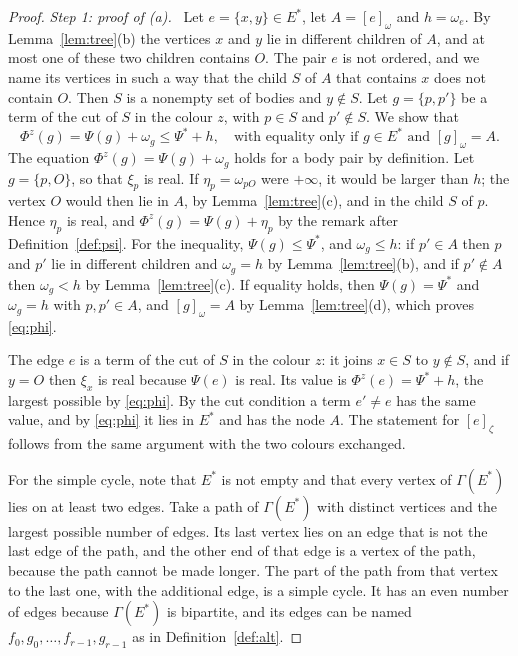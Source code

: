 \documentclass[11pt]{amsart}
\theoremstyle{definition}
\theoremstyle{remark}
\numberwithin{equation}{section}
\newcommand{\Ps}{\Psi^{*}}
\newcommand{\Es}{E^{*}}
\newcommand{\nd}[2]{[#1]_{#2}}
\newcommand{\step}[1]{\smallskip\noindent\textit{#1}\ }
\begin{document}
\begin{proof}
\step{Step 1: proof of (a).} Let $e = \{x, y\} \in \Es$, let $A = \nd{e}{\omega}$ and $h = \omega_e$. By
Lemma~\ref{lem:tree}(b) the vertices $x$ and $y$ lie in different children of $A$, and at most one of
these two children contains $O$. The pair $e$ is not ordered, and we name its vertices in such a way that the child $S$ of $A$ that
contains $x$ does not contain $O$. Then $S$ is a nonempty set of bodies and $y \notin S$. Let $g = \{p, p'\}$ be a term of the cut of $S$ in the colour $z$, with $p \in S$ and
$p' \notin S$. We show that
\begin{equation}\label{eq:phi}
  \Phi^z(g) = \Psi(g) + \omega_g \le \Ps + h, \quad\text{with equality only if } g \in \Es
  \text{ and } \nd{g}{\omega} = A .
\end{equation}
The equation $\Phi^z(g) = \Psi(g) + \omega_g$ holds for a body pair by definition. Let $g = \{p, O\}$,
so that $\xi_p$ is real. If $\eta_p = \omega_{pO}$ were $+\infty$, it would be larger than $h$; the
vertex $O$ would then lie in $A$, by Lemma~\ref{lem:tree}(c), and in the child $S$ of $p$. Hence
$\eta_p$ is real, and $\Phi^z(g) = \Psi(g) + \eta_p$ by the remark after Definition~\ref{def:psi}. For
the inequality, $\Psi(g) \le \Ps$, and $\omega_g \le h$: if $p' \in A$ then $p$ and $p'$ lie in different
children and $\omega_g = h$ by Lemma~\ref{lem:tree}(b), and if $p' \notin A$ then $\omega_g < h$ by
Lemma~\ref{lem:tree}(c). If equality holds, then $\Psi(g) = \Ps$ and $\omega_g = h$ with $p, p' \in A$,
and $\nd{g}{\omega} = A$ by Lemma~\ref{lem:tree}(d), which proves \eqref{eq:phi}.

The edge $e$ is a term of the cut of $S$ in the colour $z$: it joins $x \in S$ to $y \notin S$, and if
$y = O$ then $\xi_x$ is real because $\Psi(e)$ is real. Its value is $\Phi^z(e) = \Ps + h$, the largest
possible by \eqref{eq:phi}. By the cut condition a term $e' \ne e$ has the same value, and by
\eqref{eq:phi} it lies in $\Es$ and has the node $A$. The statement for $\nd{e}{\zeta}$ follows from
the same argument with the two colours exchanged.

For the simple cycle, note that $\Es$ is not empty and that every vertex of $\Gamma(\Es)$ lies on at
least two edges. Take a path of $\Gamma(\Es)$ with distinct vertices and the largest possible number of
edges. Its last vertex lies on an edge that is not the last edge of the path, and the other end of that
edge is a vertex of the path, because the path cannot be made longer. The part of the path from that
vertex to the last one, with the additional edge, is a simple cycle. It has an even number of edges
because $\Gamma(\Es)$ is bipartite, and its edges can be named $f_0, g_0, \dots, f_{r-1}, g_{r-1}$ as in
Definition~\ref{def:alt}.


\end{proof}
\end{document}
